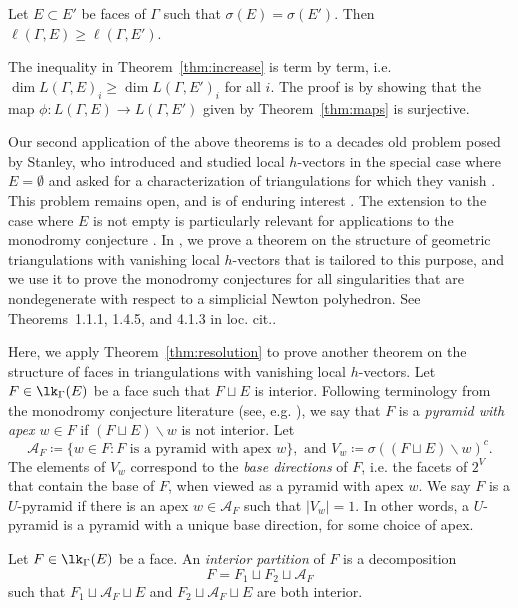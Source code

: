 \begin{theorem}\label{thm:increase} 
Let $E \subset E'$ be faces of $\Gamma$ such that $\sigma(E) = \sigma(E')$. Then $\ell (\Gamma, E) \geq \ell(\Gamma, E')$.
\end{theorem}

The inequality in Theorem~\ref{thm:increase} is term by term, i.e. $\dim L(\Gamma, E)_i \geq \dim L(\Gamma,E')_i$ for all $i$. The proof is by showing that the map $\phi \colon L(\Gamma, E) \to L(\Gamma,E')$ given by Theorem~\ref{thm:maps} is surjective.


Our second application of the above theorems is to a decades old problem posed by Stanley, who introduced and studied local $h$-vectors in the special case where $E = \emptyset$ and asked for a characterization of triangulations for which they vanish \cite[Problem~4.13]{Stanley92}. This problem remains open, and is of enduring interest \cite[Problem~2.12]{Athanasiadis16}. The extension to the case where $E$ is not empty is particularly relevant for applications to the monodromy conjecture \cite{Igusa78, DenefLoeser98, Stapledon17}. In \cite{LarsonPayneStapledon}, we prove a theorem on the structure of geometric triangulations with vanishing local $h$-vectors that is tailored to this purpose, and we use it to prove the monodromy conjectures for all singularities that are nondegenerate with respect to a simplicial Newton polyhedron.  See Theorems~1.1.1, 1.4.5, and 4.1.3 in loc. cit..

Here, we apply  Theorem~\ref{thm:resolution} to prove another theorem on the structure of faces in triangulations with vanishing local $h$-vectors.  Let $F \in \lk_\Gamma(E)$ be a face such that $F\sqcup E$ is interior. Following terminology from the monodromy conjecture literature (see, e.g. \cite{LemahieuVanProeyen11}), we say that $F$ is a \emph{pyramid with apex $w \in F$}  if $(F \sqcup E )  \smallsetminus w$ is not interior. Let $$\mathcal{A}_F  \coloneqq  \{ w \in F : F \mbox{ is a pyramid with apex } w \}, \mbox{ \ and \ } V_w  \coloneqq  \sigma( (F \sqcup E) \smallsetminus w)^c.$$
The elements of $V_w$ correspond to the \emph{base directions} of $F$, i.e. the facets of $2^V$ that contain the base of $F$, when viewed as a pyramid with apex $w$.  We say $F$ is a $U$-pyramid if there is an apex $w \in \mathcal{A}_F$ such that $|V_w|  = 1$. In other words, a $U$-pyramid is a pyramid with a unique base direction, for some choice of apex.

\begin{definition}
Let $F \in \lk_{\Gamma}(E)$ be a face.  An \emph{interior partition} of $F$ is a decomposition
\[
F = F_1 \sqcup F_2 \sqcup \mathcal{A}_F
\]
such that $F_1 \sqcup \mathcal{A}_F \sqcup E$ and $F_2 \sqcup \mathcal{A}_F \sqcup E$ are both interior.
\end{definition}

